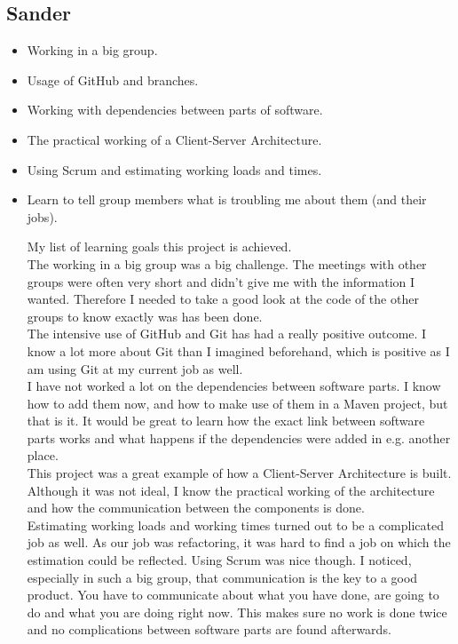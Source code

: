 \documentclass{article}
\begin{document}
\begin{enumerate}
\subsection*{Sander}
\begin{itemize}
\item Working in a big group.
\item Usage of GitHub and branches.
\item Working with dependencies between parts of software.
\item The practical working of a Client-Server Architecture.
\item Using Scrum and estimating working loads and times.
\item Learn to tell group members what is troubling me about them (and their jobs).
 
My list of learning goals this project is achieved.\\
The working in a big group was a big challenge. The meetings with other groups were often very short and didn't give me with the information I wanted. Therefore I needed to take a good look at the code of the other groups to know exactly was has been done.\\
The intensive use of GitHub and Git has had a really positive outcome. I know a lot more about Git than I imagined beforehand, which is positive as I am using Git at my current job as well.\\
I have not worked a lot on the dependencies between software parts. I know how to add them now, and how to make use of them in a Maven project, but that is it. It would be great to learn how the exact link between software parts works and what happens if the dependencies were added in e.g. another place.\\
This project was a great example of how a Client-Server Architecture is built. Although it was not ideal, I know the practical working of the architecture and how the communication between the components is done.\\
Estimating working loads and working times turned out to be a complicated job as well. As our job was refactoring, it was hard to find a job on which the estimation could be reflected. Using Scrum was nice though. I noticed, especially in such a big group, that communication is the key to a good product. You have to communicate about what you have done, are going to do and what you are doing right now. This makes sure no work is done twice and no complications between software parts are found afterwards.\\

\end{itemize}
\end{enumerate}
\end{document}
